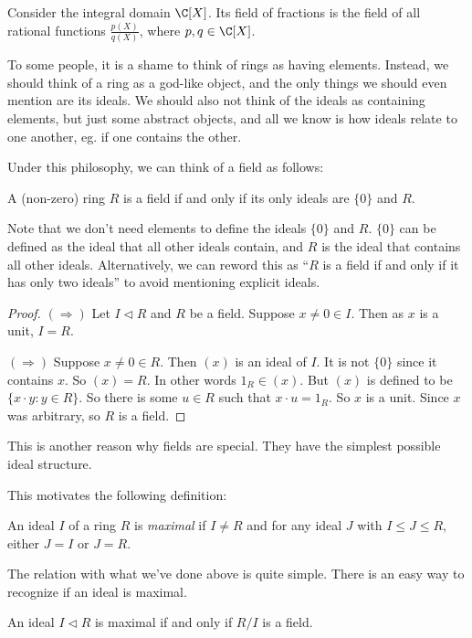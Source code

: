 \documentclass[a4paper]{article}
\begin{document}
\begin{eg}
  Consider the integral domain $\C[X]$. Its field of fractions is the field of all rational functions $\frac{p(X)}{q(X)}$, where $p, q \in \C[X]$.
\end{eg}
To some people, it is a shame to think of rings as having elements. Instead, we should think of a ring as a god-like object, and the only things we should even mention are its ideals. We should also not think of the ideals as containing elements, but just some abstract objects, and all we know is how ideals relate to one another, eg. if one contains the other.

Under this philosophy, we can think of a field as follows:
\begin{lemma}
  A (non-zero) ring $R$ is a field if and only if its only ideals are $\{0\}$ and $R$.
\end{lemma}
Note that we don't need elements to define the ideals $\{0\}$ and $R$. $\{0\}$ can be defined as the ideal that all other ideals contain, and $R$ is the ideal that contains all other ideals. Alternatively, we can reword this as ``$R$ is a field if and only if it has only two ideals'' to avoid mentioning explicit ideals.

\begin{proof}
  $(\Rightarrow)$ Let $I \lhd R$ and $R$ be a field. Suppose $x \not= 0 \in I$. Then as $x$ is a unit, $I = R$.

  $(\Rightarrow)$ Suppose $x \not= 0 \in R$. Then $(x)$ is an ideal of $I$. It is not $\{0\}$ since it contains $x$. So $(x) = R$. In other words $1_R \in (x)$. But $(x)$ is defined to be $\{x \cdot y: y \in R\}$. So there is some $u \in R$ such that $x\cdot u = 1_R$. So $x$ is a unit. Since $x$ was arbitrary, so $R$ is a field.
\end{proof}
This is another reason why fields are special. They have the simplest possible ideal structure.

This motivates the following definition:

\begin{defi}
  An ideal $I$ of a ring $R$ is \emph{maximal} if $I \not= R$ and for any ideal $J$ with $I \leq J \leq R$, either $J = I$ or $J = R$.
\end{defi}

The relation with what we've done above is quite simple. There is an easy way to recognize if an ideal is maximal.

\begin{lemma}
  An ideal $I \lhd R$ is maximal if and only if $R/I$ is a field.
\end{lemma}
\end{document}

